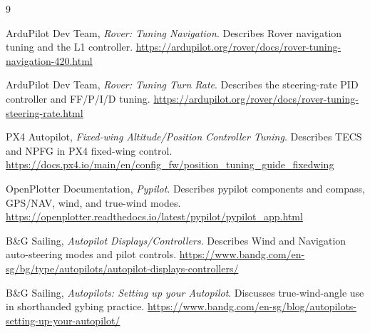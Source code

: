\documentclass[11pt,twocolumn]{article}
\begin{document}
\begin{thebibliography}{9}

ArduPilot Dev Team,
\emph{Rover: Tuning Navigation}.  Describes Rover navigation tuning and the L1 controller.
\url{https://ardupilot.org/rover/docs/rover-tuning-navigation-420.html}

ArduPilot Dev Team,
\emph{Rover: Tuning Turn Rate}.  Describes the steering-rate PID controller and FF/P/I/D tuning.
\url{https://ardupilot.org/rover/docs/rover-tuning-steering-rate.html}

PX4 Autopilot,
\emph{Fixed-wing Altitude/Position Controller Tuning}.  Describes TECS and NPFG in PX4 fixed-wing control.
\url{https://docs.px4.io/main/en/config_fw/position_tuning_guide_fixedwing}

OpenPlotter Documentation,
\emph{Pypilot}.  Describes pypilot components and compass, GPS/NAV, wind, and true-wind modes.
\url{https://openplotter.readthedocs.io/latest/pypilot/pypilot_app.html}

B\&G Sailing,
\emph{Autopilot Displays/Controllers}.  Describes Wind and Navigation auto-steering modes and pilot controls.
\url{https://www.bandg.com/en-sg/bg/type/autopilots/autopilot-displays-controllers/}

B\&G Sailing,
\emph{Autopilots: Setting up your Autopilot}.  Discusses true-wind-angle use in shorthanded gybing practice.
\url{https://www.bandg.com/en-sg/blog/autopilots-setting-up-your-autopilot/}

\end{thebibliography}
\end{document}
